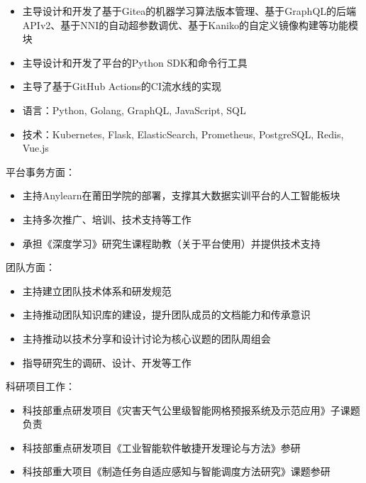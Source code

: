 \documentclass[letterpaper]{twentysecondcv} %
\begin{document}
\begin{twentyfluid}
{{\begin{itemize}
        \item 主导设计和开发了基于Gitea的机器学习算法版本管理、基于GraphQL的后端APIv2、基于NNI的自动超参数调优、基于Kaniko的自定义镜像构建等功能模块
        \item 主导设计和开发了平台的Python SDK和命令行工具
        \item 主导了基于GitHub Actions的CI流水线的实现
        \item 语言：Python, Golang, GraphQL, JavaScript, SQL
        \item 技术：Kubernetes, Flask, ElasticSearch, Prometheus, PostgreSQL, Redis, Vue.js
    \end{itemize}
    平台事务方面：
    \vspace{-0.1cm}
    \begin{itemize}
        \item 主持Anylearn在莆田学院的部署，支撑其大数据实训平台的人工智能板块
        \item 主持多次推广、培训、技术支持等工作
        \item 承担《深度学习》研究生课程助教（关于平台使用）并提供技术支持
    \end{itemize}
    团队方面：
    \vspace{-0.1cm}
    \begin{itemize}
        \item 主持建立团队技术体系和研发规范
        \item 主持推动团队知识库的建设，提升团队成员的文档能力和传承意识
        \item 主持推动以技术分享和设计讨论为核心议题的团队周组会
        \item 指导研究生的调研、设计、开发等工作
    \end{itemize}
    科研项目工作：
    \vspace{-0.1cm}
    \begin{itemize}
        \item 科技部重点研发项目《灾害天气公里级智能网格预报系统及示范应用》子课题负责
        \item 科技部重点研发项目《工业智能软件敏捷开发理论与方法》参研
        \item 科技部重大项目《制造任务自适应感知与智能调度方法研究》课题参研
    \end{itemize}
    }
    }
\end{twentyfluid}

\vspace{-0.2cm}
\end{document}
